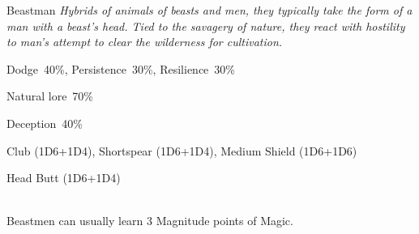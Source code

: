 \begin{monsterbox}{Beastman}
	\textit{Hybrids of animals of beasts and men, they typically take the form of a man with a beast’s head. Tied to the savagery of nature, they react with hostility to man’s attempt to clear the wilderness for cultivation.  }\\
	\rpghline
	\basics[%
        hitpoints  = 16,
	majorwound = 8,
	damagemodifier = +1D4,
	powerpoints = 11,
	movementrate = 15m,
	armor = Leather (2AP),
	plunderrating = 2
	]
	\rpghline%
	\stats[ %
		STR = 2D6+6  (13),
		CON = 1D6+12 (16),
		DEX = 3D6    (11),
		SIZ = 1D6+12 (16),
		INT = 2D6+6  (13),
		POW = 3D6    (11),
		CHA = 2D6    (7)
	]
	\rpghline%
	\begin{rpg-monsteraction}[Resistances]
		Dodge~40\%, Persistence~30\%, Resilience~30\%
	\end{rpg-monsteraction}
	\begin{rpg-monsteraction}[Knowledge]
    		Natural lore~70\%
	\end{rpg-monsteraction}
	\begin{rpg-monsteraction}[Practical]
		Deception~40\%
	\end{rpg-monsteraction}
	\begin{rpg-monsteraction}
		Club (1D6+1D4), Shortspear (1D6+1D4), Medium Shield (1D6+1D6)
	\end{rpg-monsteraction}
	\begin{rpg-monsteraction}
		Head Butt (1D6+1D4)
	\end{rpg-monsteraction}
	\begin{rpg-monsteraction}[Supernatural]\\
		Beastmen can usually learn 3 Magnitude points of Magic.
	\end{rpg-monsteraction}

\end{monsterbox}

\newpage



